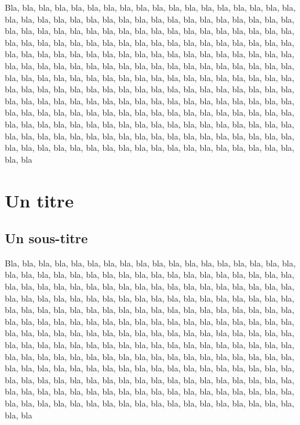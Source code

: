 Bla, bla, bla, bla, bla, bla, bla, bla, bla, bla, bla, bla, bla, bla, bla, bla, bla, bla, bla, bla, bla, bla, bla, bla, bla, bla, bla, bla, bla, bla, bla, bla, bla, bla, bla, bla, bla, bla, bla, bla, bla, bla, bla, bla, bla, bla, bla, bla, bla, bla, bla, bla, bla, bla, bla, bla, bla, bla, bla, bla, bla, bla, bla, bla, bla, bla, bla, bla, bla, bla, bla, bla, bla, bla, bla, bla, bla, bla, bla, bla, bla, bla, bla, bla, bla, bla, bla, bla, bla, bla, bla, bla, bla, bla, bla, bla, bla, bla, bla, bla, bla, bla, bla, bla, bla, bla, bla, bla, bla, bla, bla, bla, bla, bla, bla, bla, bla, bla, bla, bla, bla, bla, bla, bla, bla, bla, bla, bla, bla, bla, bla, bla, bla, bla, bla, bla, bla, bla, bla, bla, bla, bla, bla, bla, bla, bla, bla, bla, bla, bla, bla, bla, bla, bla, bla, bla, bla, bla, bla, bla, bla, bla, bla, bla, bla, bla, bla, bla, bla, bla, bla, bla, bla, bla, bla, bla, bla, bla, bla, bla, bla, bla, bla, bla, bla, bla, bla, bla, bla, bla, bla, bla, bla, bla, bla, bla, bla, bla, bla, bla, bla, bla, bla, bla, bla, bla, bla, bla, bla, bla, bla, bla, bla, bla, bla, bla, bla, bla, bla, bla, bla, bla, bla, bla, bla, bla, bla, bla, bla, bla, bla, bla, bla, bla, bla, bla


\section{Un titre}
	\subsection{Un sous-titre}

Bla, bla, bla, bla, bla, bla, bla, bla, bla, bla, bla, bla, bla, bla, bla, bla, bla, bla, bla, bla, bla, bla, bla, bla, bla, bla, bla, bla, bla, bla, bla, bla, bla, bla, bla, bla, bla, bla, bla, bla, bla, bla, bla, bla, bla, bla, bla, bla, bla, bla, bla, bla, bla, bla, bla, bla, bla, bla, bla, bla, bla, bla, bla, bla, bla, bla, bla, bla, bla, bla, bla, bla, bla, bla, bla, bla, bla, bla, bla, bla, bla, bla, bla, bla, bla, bla, bla, bla, bla, bla, bla, bla, bla, bla, bla, bla, bla, bla, bla, bla, bla, bla, bla, bla, bla, bla, bla, bla, bla, bla, bla, bla, bla, bla, bla, bla, bla, bla, bla, bla, bla, bla, bla, bla, bla, bla, bla, bla, bla, bla, bla, bla, bla, bla, bla, bla, bla, bla, bla, bla, bla, bla, bla, bla, bla, bla, bla, bla, bla, bla, bla, bla, bla, bla, bla, bla, bla, bla, bla, bla, bla, bla, bla, bla, bla, bla, bla, bla, bla, bla, bla, bla, bla, bla, bla, bla, bla, bla, bla, bla, bla, bla, bla, bla, bla, bla, bla, bla, bla, bla, bla, bla, bla, bla, bla, bla, bla, bla, bla, bla, bla, bla, bla, bla, bla, bla, bla, bla, bla, bla, bla, bla, bla, bla, bla, bla, bla, bla, bla, bla, bla, bla, bla, bla, bla, bla, bla, bla, bla, bla, bla, bla, bla, bla, bla, bla


